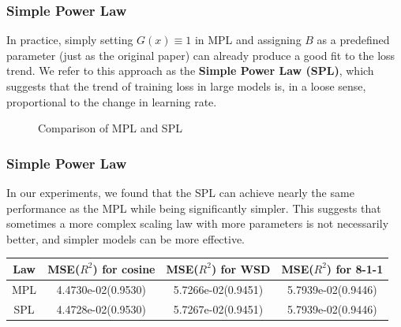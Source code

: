 \documentclass[aspectratio=169]{beamer}
\begin{document}
    \begin{frame}
        \frametitle{Simple Power Law}
        In practice, simply setting $G(x) \equiv 1$ in MPL and assigning
        $B$ as a predefined parameter (just as the original paper) can
        already produce a good fit to the loss trend. We refer to this
        approach as the \textbf{Simple Power Law (SPL)}, which suggests
        that the trend of training loss in large models is, in a loose
        sense, proportional to the change in learning rate.

        \begin{figure}
            \centering
            \caption{Comparison of MPL and SPL}\label{fig:spl}
        \end{figure}
    \end{frame}

    \begin{frame}
        \frametitle{Simple Power Law}

        In our experiments, we found that the SPL can achieve nearly the
        same performance as the MPL while being significantly simpler.
        This suggests that sometimes a more complex scaling law with more
        parameters is not necessarily better, and simpler models can be
        more effective.
        \begin{table}
            \centering
            \begin{tabular}{cccc}
                \toprule
                Law & MSE($R^2$) for cosine & MSE($R^2$)  for WSD  & MSE($R^2$)  for 8-1-1 \\
                \midrule
                MPL & 4.4730e-02(0.9530)    & 5.7266e-02(0.9451) & 5.7939e-02(0.9446)  \\
                SPL & 4.4728e-02(0.9530)    & 5.7267e-02(0.9451) & 5.7939e-02(0.9446)  \\
                \bottomrule
            \end{tabular}\label{tab:table2}
        \end{table}
    \end{frame}
\end{document}
